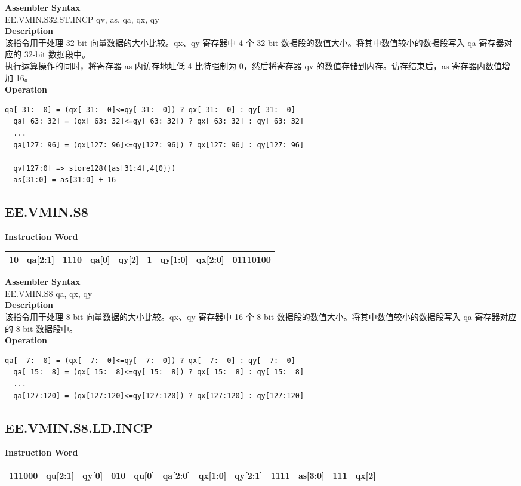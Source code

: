 \textbf{Assembler Syntax} \\
EE.VMIN.S32.ST.INCP qv, as, qa, qx, qy \\
\textbf{Description} \\
该指令用于处理 32-bit 向量数据的大小比较。qx、qy 寄存器中 4 个 32-bit 数据段的数值大小。将其中数值较小的数据段写入 qa 寄存器对应的 32-bit 数据段中。\\
执行运算操作的同时，将寄存器 as 内访存地址低 4 比特强制为 0，然后将寄存器 qv 的数值存储到内存。访存结束后，as 寄存器内数值增加 16。\\
\textbf{Operation}
\begin{lstlisting}[escapeinside=`?]
  qa[ 31:  0] = (qx[ 31:  0]<=qy[ 31:  0]) ? qx[ 31:  0] : qy[ 31:  0]
  qa[ 63: 32] = (qx[ 63: 32]<=qy[ 63: 32]) ? qx[ 63: 32] : qy[ 63: 32]
  ...
  qa[127: 96] = (qx[127: 96]<=qy[127: 96]) ? qx[127: 96] : qy[127: 96]

  qv[127:0] => store128({as[31:4],4{0}})
  as[31:0] = as[31:0] + 16
\end{lstlisting}

\clearpage
\subsection{EE.VMIN.S8}\label{instruction:EEVMINS8}
\setlength\tabcolsep{6pt}
\textbf{Instruction Word} \\
\begin{tabular}{|c|c|c|c|c|c|c|c|c|}
	\hline
	10 & qa[2:1] & 1110 & qa[0] & qy[2] & 1 & qy[1:0] & qx[2:0] & 01110100 \\
	\hline
\end{tabular}

\textbf{Assembler Syntax} \\
EE.VMIN.S8 qa, qx, qy \\
\textbf{Description} \\
该指令用于处理 8-bit 向量数据的大小比较。qx、qy 寄存器中 16 个 8-bit 数据段的数值大小。将其中数值较小的数据段写入 qa 寄存器对应的 8-bit 数据段中。\\
\textbf{Operation}
\begin{lstlisting}[escapeinside=`?]
  qa[  7:  0] = (qx[  7:  0]<=qy[  7:  0]) ? qx[  7:  0] : qy[  7:  0]
  qa[ 15:  8] = (qx[ 15:  8]<=qy[ 15:  8]) ? qx[ 15:  8] : qy[ 15:  8]
  ...
  qa[127:120] = (qx[127:120]<=qy[127:120]) ? qx[127:120] : qy[127:120]
\end{lstlisting}

\clearpage
\subsection{EE.VMIN.S8.LD.INCP}\label{instruction:EEVMINS8LDINCP}
\setlength\tabcolsep{6pt}
\textbf{Instruction Word} \\
\begin{tabular}{|c|c|c|c|c|c|c|c|c|c|c|c|}
	\hline
	111000 & qu[2:1] & qy[0] & 010 & qu[0] & qa[2:0] & qx[1:0] & qy[2:1] & 1111 & as[3:0] & 111 & qx[2] \\
	\hline
\end{tabular}

